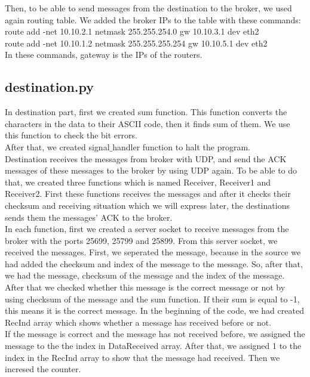 \documentclass[conference]{IEEEtran}
\begin{document}
Then, to be able to send messages from the destination to the broker, we used again routing table. We added the broker IPs to the table with these commands:\\
route add -net 10.10.2.1 netmask 255.255.254.0 gw 10.10.3.1 dev eth2\\
route add -net 10.10.1.2 netmask 255.255.255.254 gw 10.10.5.1 dev eth2\\
In these commands, gateway is the IPs of the routers.

\subsection{destination.py}
In destination part, first we created sum function. This function converts the characters in the data to their ASCII code, then it finds sum of them. We use this function to check the bit errors. \\

After that, we created signal$\_$handler function to halt the program.\\

Destination receives the messages from broker with UDP, and send the ACK messages of these messages to the broker by using UDP again. To be able to do that, we created three functions which is named Receiver, Receiver1 and Receiver2. First these functions receives the messages and after it checks their checksum and receiving situation which we will express later, the destinations sends them the messages' ACK to the broker. \\

In each function, first we created a server socket to receive messages from the broker with the ports 25699, 25799 and 25899. From this server socket, we received the messages. First, we seperated the message, because in the source we had added the checksum and index of the message to the message. So, after that, we had the message, checksum of the message and the index of the message. \\

After that we checked whether this message is the correct message or not by using checksum of the message and the sum function. If their sum is equal to -1, this means it is the correct message. In the beginning of the code, we had created RecInd array which shows whether a message has received before or not. \\

If the message is correct and the message has not received before, we assigned the message to the the index in DataReceived array. After that, we assigned 1 to the index in the RecInd array to show that the message had received. Then we incresed the counter. \\
\end{document}
